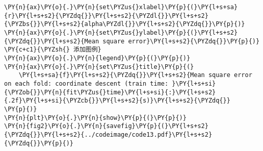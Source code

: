 \begin{Verbatim}[commandchars=\\\{\}]
\PY{n}{ax}\PY{o}{.}\PY{n}{set\PYZus{}xlabel}\PY{p}{(}\PY{l+s+sa}{r}\PY{l+s+s2}{\PYZdq{}}\PY{l+s+s2}{\PYZdl{}}\PY{l+s+s2}{\PYZbs{}}\PY{l+s+s2}{alpha\PYZdl{}}\PY{l+s+s2}{\PYZdq{}}\PY{p}{)}
\PY{n}{ax}\PY{o}{.}\PY{n}{set\PYZus{}ylabel}\PY{p}{(}\PY{l+s+s2}{\PYZdq{}}\PY{l+s+s2}{Mean square error}\PY{l+s+s2}{\PYZdq{}}\PY{p}{)}
\PY{c+c1}{\PYZsh{} 添加图例}
\PY{n}{ax}\PY{o}{.}\PY{n}{legend}\PY{p}{(}\PY{p}{)}
\PY{n}{ax}\PY{o}{.}\PY{n}{set\PYZus{}title}\PY{p}{(}
    \PY{l+s+sa}{f}\PY{l+s+s2}{\PYZdq{}}\PY{l+s+s2}{Mean square error on each fold: coordinate descent (train time: }\PY{l+s+si}{\PYZob{}}\PY{n}{fit\PYZus{}time}\PY{l+s+si}{:}\PY{l+s+s2}{.2f}\PY{l+s+si}{\PYZcb{}}\PY{l+s+s2}{s)}\PY{l+s+s2}{\PYZdq{}}
\PY{p}{)}
\PY{n}{plt}\PY{o}{.}\PY{n}{show}\PY{p}{(}\PY{p}{)}
\PY{n}{fig2}\PY{o}{.}\PY{n}{savefig}\PY{p}{(}\PY{l+s+s2}{\PYZdq{}}\PY{l+s+s2}{../codeimage/code13.pdf}\PY{l+s+s2}{\PYZdq{}}\PY{p}{)}
\end{Verbatim}
